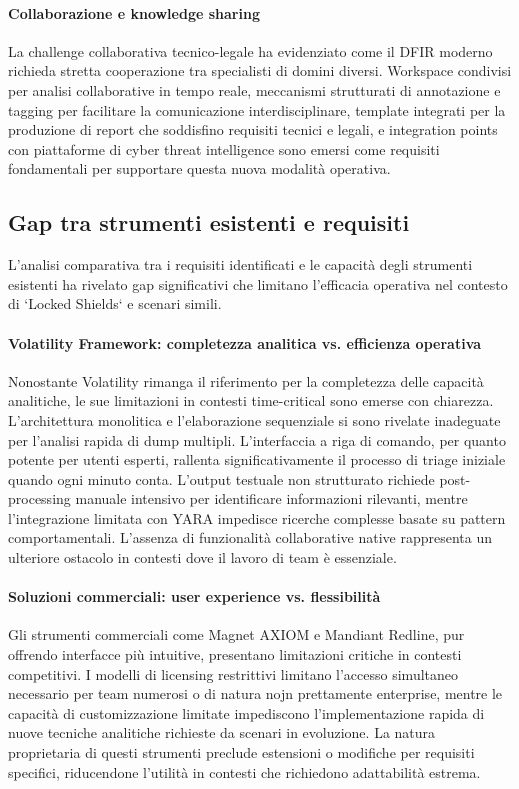 \paragraph{Collaborazione e knowledge sharing}
La challenge collaborativa tecnico-legale ha evidenziato come il DFIR moderno richieda stretta cooperazione tra specialisti di domini diversi. Workspace condivisi per analisi collaborative in tempo reale, meccanismi strutturati di annotazione e tagging per facilitare la comunicazione interdisciplinare, template integrati per la produzione di report che soddisfino requisiti tecnici e legali, e integration points con piattaforme di cyber threat intelligence sono emersi come requisiti fondamentali per supportare questa nuova modalità operativa.

\subsection{Gap tra strumenti esistenti e requisiti}

L'analisi comparativa tra i requisiti identificati e le capacità degli strumenti esistenti ha rivelato gap significativi che limitano l'efficacia operativa nel contesto di `Locked Shields` e scenari simili.

\paragraph{Volatility Framework: completezza analitica vs. efficienza operativa}
Nonostante Volatility rimanga il riferimento per la completezza delle capacità analitiche, le sue limitazioni in contesti time-critical sono emerse con chiarezza. L'architettura monolitica e l'elaborazione sequenziale si sono rivelate inadeguate per l'analisi rapida di dump multipli. L'interfaccia a riga di comando, per quanto potente per utenti esperti, rallenta significativamente il processo di triage iniziale quando ogni minuto conta. L'output testuale non strutturato richiede post-processing manuale intensivo per identificare informazioni rilevanti, mentre l'integrazione limitata con YARA impedisce ricerche complesse basate su pattern comportamentali. L'assenza di funzionalità collaborative native rappresenta un ulteriore ostacolo in contesti dove il lavoro di team è essenziale.

\paragraph{Soluzioni commerciali: user experience vs. flessibilità}
Gli strumenti commerciali come Magnet AXIOM e Mandiant Redline, pur offrendo interfacce più intuitive, presentano limitazioni critiche in contesti competitivi. I modelli di licensing restrittivi limitano l'accesso simultaneo necessario per team numerosi o di natura nojn prettamente enterprise, mentre le capacità di customizzazione limitate impediscono l'implementazione rapida di nuove tecniche analitiche richieste da scenari in evoluzione. La natura proprietaria di questi strumenti preclude estensioni o modifiche per requisiti specifici, riducendone l'utilità in contesti che richiedono adattabilità estrema.


